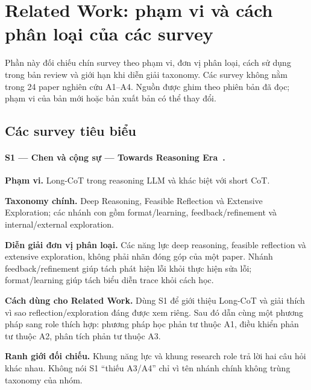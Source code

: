 \section{Related Work: phạm vi và cách phân loại của các survey}
\label{sec:related_work}

Phần này đối chiếu chín survey theo phạm vi, đơn vị phân loại, cách sử dụng trong bản review và giới hạn khi diễn giải taxonomy. Các survey không nằm trong 24 paper nghiên cứu A1–A4. Nguồn được ghim theo phiên bản đã đọc; phạm vi của bản mới hoặc bản xuất bản có thể thay đổi.
\subsection{Các survey tiêu biểu}

\paragraph{S1 — Chen và cộng sự — Towards Reasoning Era~\cite{survey_chen2025reasoning}.}
\noindent\textbf{Phạm vi.} Long-CoT trong reasoning LLM và khác biệt với short CoT.\par
\noindent\textbf{Taxonomy chính.} Deep Reasoning, Feasible Reflection và Extensive Exploration; các nhánh con gồm format/learning, feedback/refinement và internal/external exploration.\par
\noindent\textbf{Diễn giải đơn vị phân loại.} Các năng lực deep reasoning, feasible reflection và extensive exploration, không phải nhãn đóng góp của một paper. Nhánh feedback/refinement giúp tách phát hiện lỗi khỏi thực hiện sửa lỗi; format/learning giúp tách biểu diễn trace khỏi cách học.\par
\noindent\textbf{Cách dùng cho Related Work.} Dùng S1 để giới thiệu Long-CoT và giải thích vì sao reflection/exploration đáng được xem riêng. Sau đó dẫn cùng một phương pháp sang role thích hợp: phương pháp học phản tư thuộc A1, điều khiển phản tư thuộc A2, phân tích phản tư thuộc A3.\par
\noindent\textbf{Ranh giới đối chiếu.} Khung năng lực và khung research role trả lời hai câu hỏi khác nhau. Không nói S1 “thiếu A3/A4” chỉ vì tên nhánh chính không trùng taxonomy của nhóm.\par
{}

